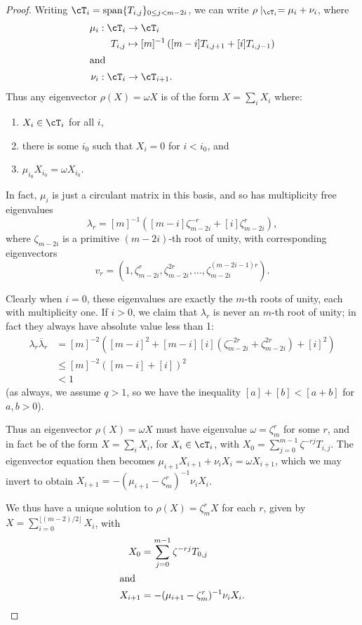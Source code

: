 \documentclass[12pt]{article}
\begin{document}
\begin{proof}
Writing $\cT_i = \Span \{ T_{i,j} \}_{0 \leq j < m- 2i}$, we can write $\rho \mid_{\cT_i} = \mu_i + \nu_i$, where
\begin{align*}
\mu_i :  \cT_i & \to \cT_i \\
  T_{i,j} & \mapsto  [m]^{-1} \left( [m-i] T_{i,j+1} + [i] T_{i,j-1}\right) \\
\intertext{and}
\nu_i : \cT_i & \to \cT_{i+1}.
\end{align*}
Thus any eigenvector $\rho(X) = \omega X$ is of the form $X = \sum_i X_i$ where:
\begin{enumerate}[(1)]
\item
$X_i\in \cT_i$ for all $i$, 
\item
there is some $i_0$ such that $X_i = 0$ for $i < i_0$, and 
\item
$\mu_{i_0} X_{i_0} = \omega X_{i_0}$.
\end{enumerate}

In fact, $\mu_i$ is just a circulant matrix in this basis, and so has multiplicity free eigenvalues
$$\lambda_r = [m]^{-1} \left([m-i] \zeta_{m-2i}^{-r} + [i] \zeta_{m-2i}^r\right),$$
where $\zeta_{m-2i}$ is a primitive $(m-2i)$-th root of unity, with corresponding eigenvectors
$$v_r = \left(1, \zeta_{m-2i}^r , \zeta_{m-2i}^{2r} , \ldots, \zeta_{m-2i}^{(m-2i-1)r} \right).$$

Clearly when $i = 0$, these eigenvalues are exactly the $m$-th roots of unity, each with multiplicity one.
If $i > 0$, we claim that $\lambda_{r}$ is never an $m$-th root of unity; in fact they always have absolute value less than 1:
\begin{align*}
\lambda_{r} \overline{\lambda}_{r} 
 & = [m]^{-2}\left([m-i]^{2}+[m-i][i]\left(\zeta_{m-2i}^{-2r}+\zeta_{m-2i}^{2r}\right)+[i]^{2}\right) \\ 
 & \le [m]^{-2}\left([m-i]+[i]\right)^{2} \\
 & < 1
\end{align*}
(as always, we assume $q>1$, so we have the inequality $[a] + [b] < [a+b]$ for $a,b>0$).


Thus an eigenvector $\rho(X) = \omega X$ must have eigenvalue $\omega  = \zeta_m^r$ for some $r$, and in fact be of the form $X = \sum_i X_i$, for $X_i \in \cT_i$, with $X_0 = \sum_{j=0}^{m-1} \zeta^{-rj} T_{i,j}$. The eigenvector equation then becomes $\mu_{i+1} X_{i+1} + \nu_i X_i = \omega X_{i+1}$, which we may invert to obtain $X_{i+1} = - (\mu_{i+1} - \zeta_m^r)^{-1} \nu_i X_i$.

We thus have a unique solution to $\rho(X) = \zeta_m^r X$ for each $r$, given by $X = \sum_{i=0}^{\lfloor(m-2)/2\rfloor} X_i$, with
\begin{align*}
X_0 & = \sum_{j=0}^{m-1} \zeta^{-rj} T_{0,j} \\
\intertext{and}
X_{i+1} & = - (\mu_{i+1} - \zeta_m^r)^{-1} \nu_i X_i.
\qedhere
\end{align*}
\end{proof}
\end{document}
